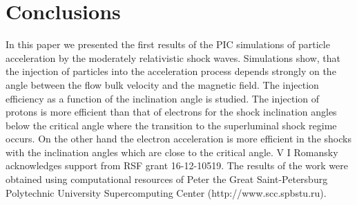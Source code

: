 \section{Conclusions}
In this paper we presented the first results of the PIC simulations of particle acceleration by the moderately relativistic shock waves. Simulations show, that the injection of particles into the acceleration process depends strongly on the angle between the flow bulk velocity and the magnetic field. The injection efficiency as a function of the inclination angle is studied. The injection of protons is more efficient than that of electrons for the shock inclination angles below the critical angle where the transition to the superluminal shock regime occurs. On the other hand the electron acceleration is more efficient in the shocks with the inclination angles which are close to the critical angle.
\ack
V I Romansky acknowledges support from RSF grant 16-12-10519.
The results of the work were obtained using computational resources of Peter the Great Saint-Petersburg Polytechnic University Supercomputing Center (http://www.scc.spbstu.ru). 